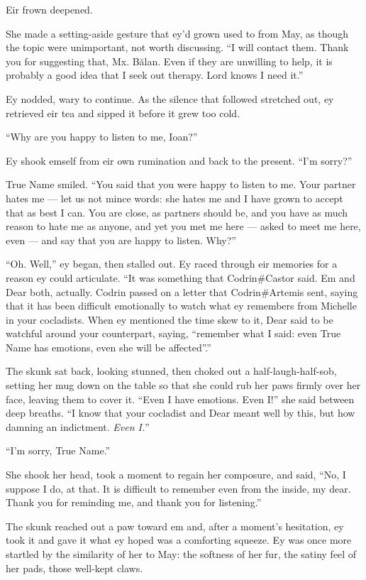 Eir frown deepened.

She made a setting-aside gesture that ey'd grown used to from May, as though the topic were unimportant, not worth discussing. ``I will contact them. Thank you for suggesting that, Mx. Bălan. Even if they are unwilling to help, it is probably a good idea that I seek out therapy. Lord knows I need it.''

Ey nodded, wary to continue. As the silence that followed stretched out, ey retrieved eir tea and sipped it before it grew too cold.

``Why are you happy to listen to me, Ioan?''

Ey shook emself from eir own rumination and back to the present. ``I'm sorry?''

True Name smiled. ``You said that you were happy to listen to me. Your partner hates me — let us not mince words: she hates me and I have grown to accept that as best I can. You are close, as partners should be, and you have as much reason to hate me as anyone, and yet you met me here — asked to meet me here, even — and say that you are happy to listen. Why?''

``Oh. Well,'' ey began, then stalled out. Ey raced through eir memories for a reason ey could articulate. ``It was something that Codrin\#Castor said. Em and Dear both, actually. Codrin passed on a letter that Codrin\#Artemis sent, saying that it has been difficult emotionally to watch what ey remembers from Michelle in your cocladists. When ey mentioned the time skew to it, Dear said to be watchful around your counterpart, saying, ``remember what I said: even True Name has emotions, even she will be affected''.''

The skunk sat back, looking stunned, then choked out a half-laugh-half-sob, setting her mug down on the table so that she could rub her paws firmly over her face, leaving them to cover it. ``Even I have emotions. Even I!'' she said between deep breaths. ``I know that your cocladist and Dear meant well by this, but how damning an indictment. \emph{Even I.}''

``I'm sorry, True Name.''

She shook her head, took a moment to regain her composure, and said, ``No, I suppose I do, at that. It is difficult to remember even from the inside, my dear. Thank you for reminding me, and thank you for listening.''

The skunk reached out a paw toward em and, after a moment's hesitation, ey took it and gave it what ey hoped was a comforting squeeze. Ey was once more startled by the similarity of her to May: the softness of her fur, the satiny feel of her pads, those well-kept claws.

